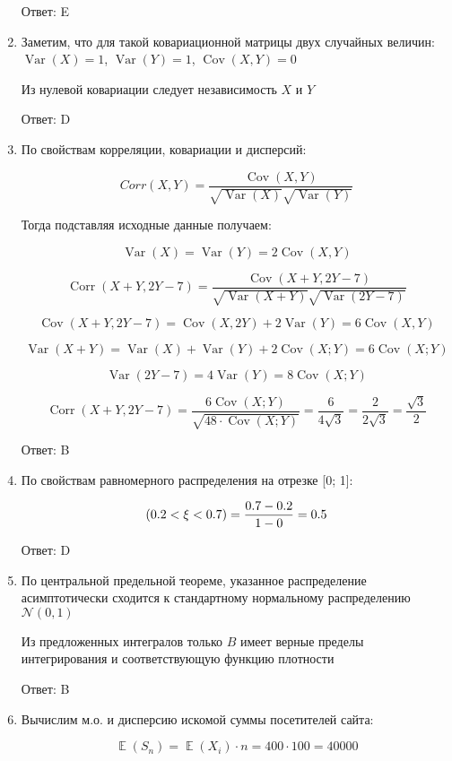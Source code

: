 \documentclass[a4paper]{article} %
\DeclareMathOperator{\Var}{Var}
\DeclareMathOperator{\Cov}{Cov}
\DeclareMathOperator{\Corr}{Corr}
\DeclareMathOperator{\E}{\mathbb{E}}
\let\P\relax
\DeclareMathOperator{\P}{\mathbb{P}}
\newcommand{\cN}{\mathcal{N}}
\begin{document}
\begin{enumerate}
    Ответ: E
    
    \item
    Заметим, что для такой ковариационной матрицы двух случайных величин: $\Var(X) = 1$, $\Var(Y) = 1$, $\Cov(X,Y) = 0$
    
    Из нулевой ковариации следует независимость $X$ и $Y$
    
    Ответ: D

    \item
    По свойствам корреляции, ковариации и дисперсий:
    
    \[Corr(X, Y) = \frac{\Cov(X, Y)}{\sqrt{\Var(X)}\sqrt{\Var(Y)}}\]
    
    Тогда подставляя исходные данные получаем: 
    
    \[\Var(X) = \Var(Y) = 2 \Cov(X, Y)\]
    
    \[\Corr(X+Y, 2Y-7) = \frac{\Cov(X+Y, 2Y-7)}{\sqrt{\Var(X+Y)}\sqrt{\Var(2Y-7)}}\] 
    
    \[\Cov(X+Y, 2Y-7) = \Cov(X, 2Y) + 2 \Var(Y) = 6\Cov(X, Y)\]
    
    \[\Var(X + Y) = \Var(X) + \Var(Y) + 2\Cov(X;Y) = 6\Cov(X; Y)\]
    
    \[\Var(2Y - 7) = 4\Var(Y) = 8\Cov(X; Y)\]
    
    \[\Corr(X+Y, 2Y-7) = \frac{6\Cov(X; Y)}{\sqrt{48\cdot\Cov(X; Y)}} = \frac{6}{4\sqrt{3}} = \frac{2}{2\sqrt{3}} = \frac{\sqrt{3}}{2}\]
    
    Ответ: B

    \item
    
    По свойствам равномерного распределения на отрезке [0; 1]:
    
    \[\P(0.2 < \xi < 0.7) = \frac{0.7 - 0.2}{1 - 0} = 0.5\]
    
    Ответ: D
    
    \item
    По центральной предельной теореме, указанное распределение асимптотически сходится к стандартному нормальному распределению $\cN(0,1)$ 
    
    Из предложенных интегралов только $B$ имеет верные пределы интегрирования и соответствующую функцию плотности
    
    Ответ: B
    
    \item
    
    Вычислим м.о. и дисперсию искомой суммы посетителей сайта:
    
    \[\E(S_n) = \E(X_i) \cdot n = 400 \cdot 100 = 40000\]
    

\end{enumerate}
\end{document}
